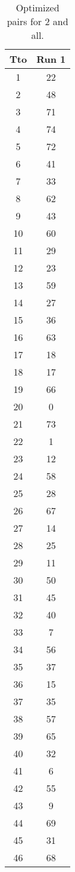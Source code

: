 \begin{table}
  \centering
  \scriptsize
  \caption{Optimized pairs for 2 and all.}
  \label{tab_pairs}
\begin{tabular}{c c }
\hline
Tto & Run 1 \\
\hline
1 & 22 \\
2 & 48 \\
3 & 71 \\
4 & 74 \\
5 & 72 \\
6 & 41 \\
7 & 33 \\
8 & 62 \\
9 & 43 \\
10 & 60 \\
11 & 29 \\
12 & 23 \\
13 & 59 \\
14 & 27 \\
15 & 36 \\
16 & 63 \\
17 & 18 \\
18 & 17 \\
19 & 66 \\
20 & 0 \\
21 & 73 \\
22 & 1 \\
23 & 12 \\
24 & 58 \\
25 & 28 \\
26 & 67 \\
27 & 14 \\
28 & 25 \\
29 & 11 \\
30 & 50 \\
31 & 45 \\
32 & 40 \\
33 & 7 \\
34 & 56 \\
35 & 37 \\
36 & 15 \\
37 & 35 \\
38 & 57 \\
39 & 65 \\
40 & 32 \\
41 & 6 \\
42 & 55 \\
43 & 9 \\
44 & 69 \\
45 & 31 \\
46 & 68 \\

\end{tabular}
\end{table}

